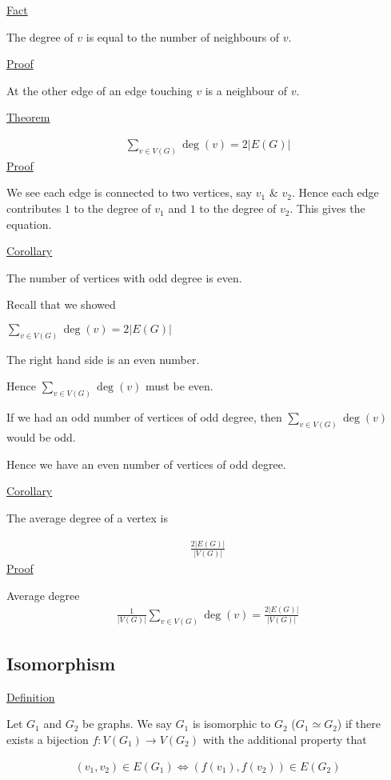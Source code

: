 \documentclass{article}
\begin{document}
\underline{Fact}

The degree of $v$ is equal to the number of neighbours of $v$.

\underline{Proof}

At the other edge of an edge touching $v$ is a neighbour of $v$. 


\underline{Theorem}

\begin{align*}
    \sum_{v \in V(G)}\deg(v) = 2 |E(G)|
\end{align*}    
\underline{Proof}

We see each edge is connected to two vertices, say $v_1$ \& $v_2$. Hence each edge contributes $1$ to the degree of $v_1$ and $1$ to the degree of $v_2$. This gives the equation. 

\underline{Corollary}

The number of vertices with odd degree is even.

Recall that we showed

$\sum_{v \in V(G)}\deg(v) = 2|E(G)|$

The right hand side is an even number.

Hence $\sum_{v \in V(G)}\deg(v)$ must be even.

If we had an odd number of vertices of odd degree, then $\sum_{v \in V(G)}\deg(v)$ would be odd.

Hence we have an even number of vertices of odd degree.

\underline{Corollary}

The average degree of a vertex is

\begin{align*}
    \frac{2|E(G)|}{|V(G)|}
\end{align*}
\underline{Proof}

Average degree
\begin{align*}
    \frac{1}{|V(G)|} \sum_{v \in V(G)}\deg(v) = \frac{2|E(G)|}{|V(G)|}
\end{align*}


\subsection{Isomorphism}

\underline{Definition}

Let $G_1$ and $G_2$ be graphs. We say $G_1$ is isomorphic to $G_2$ ($G_1 \simeq G_2$) if there exists a bijection $f: V(G_1) \to V(G_2)$ with the additional property that

\begin{align*}
    (v_1, v_2) \in E(G_1) \iff (f(v_1),f(v_2)) \in E(G_2)
\end{align*}
\end{document}

